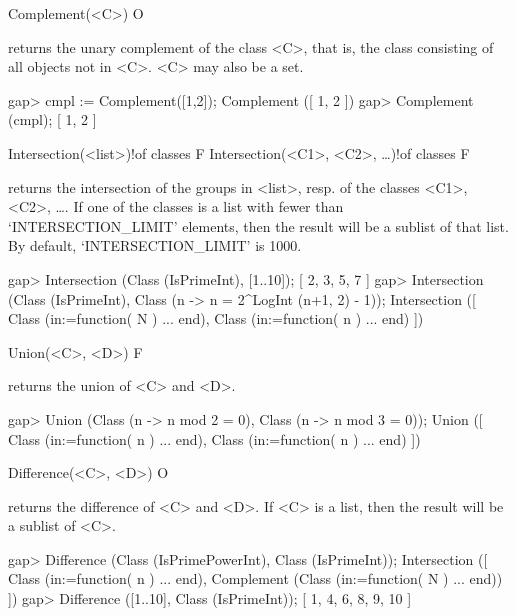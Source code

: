 
\>Complement(<C>) O

returns the unary complement of the class <C>, that is, the class consisting
of all objects not in <C>. <C> may also be a set.

\beginexample
gap> cmpl := Complement([1,2]);
Complement ([ 1, 2 ])
gap> Complement (cmpl);
[ 1, 2 ]
\endexample

\>Intersection(<list>)!{of classes} F
\>Intersection(<C1>, <C2>, \dots)!{of classes} F

returns the intersection of the groups in <list>, resp. of the classes
<C1>, <C2>, \dots. If one of the classes is a list with fewer than
`INTERSECTION_LIMIT' elements, then the result will be
a sublist of that list. By default, `INTERSECTION_LIMIT' is 1000. 

\beginexample
gap> Intersection (Class (IsPrimeInt), [1..10]);
[ 2, 3, 5, 7 ]
gap> Intersection (Class (IsPrimeInt), Class (n -> n = 2^LogInt (n+1, 2) - 1));
Intersection ([ Class (in:=function( N ) ... end), 
  Class (in:=function( n ) ... end) ])
\endexample

\>Union(<C>, <D>) F

returns the union of <C> and <D>.  

\beginexample
gap> Union (Class (n -> n mod 2 = 0), Class (n -> n mod 3 = 0));
Union ([ Class (in:=function( n ) ... end), Class (in:=function( n ) ... end) 
 ])
\endexample

\>Difference(<C>, <D>) O

returns the difference of <C> and <D>. If <C> is a list, then the
result will be a sublist of <C>.

\beginexample
gap> Difference (Class (IsPrimePowerInt), Class (IsPrimeInt));
Intersection ([ Class (in:=function( n ) ... end), 
  Complement (Class (in:=function( N ) ... end)) ])
gap> Difference ([1..10], Class (IsPrimeInt));
[ 1, 4, 6, 8, 9, 10 ]
\endexample


